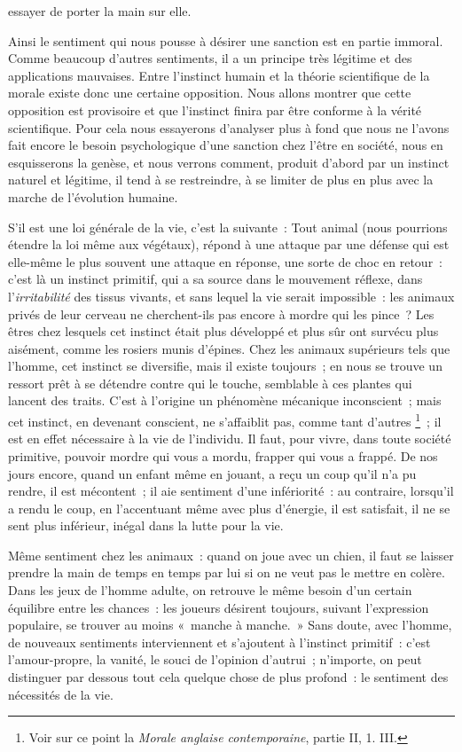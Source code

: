 \documentclass[french,twoside]{book} %
\begin{document}
essayer de porter la main sur elle.\par
Ainsi le sentiment qui nous pousse à désirer une sanction est en partie immoral. Comme beaucoup d’autres sentiments, il a un principe très légitime et des applications mauvaises. Entre l’instinct humain et la théorie scientifique de la morale existe donc une certaine opposition. Nous allons montrer que cette opposition est provisoire et que l’instinct finira par être conforme à la vérité scientifique. Pour cela nous essayerons d’analyser plus à fond que nous ne l’avons fait encore le besoin psychologique d’une sanction chez l’être en société, nous en esquisserons la genèse, et nous verrons comment, produit d’abord par un instinct naturel et légitime, il tend à se restreindre, à se limiter de plus en plus avec la marche de l’évolution humaine.\par
S’il est une loi générale de la vie, c’est la suivante : Tout animal (nous pourrions étendre la loi même aux végétaux), répond à une attaque par une défense qui est elle-même le plus souvent une attaque en réponse, une sorte de choc en retour : c’est là un instinct primitif, qui a sa source dans le mouvement réflexe, dans l’\emph{irritabilité} des tissus vivants, et sans lequel la vie serait impossible : les animaux privés de leur cerveau ne cherchent-ils pas encore à mordre qui les pince ? Les êtres chez lesquels cet instinct était plus développé et plus sûr ont survécu plus aisément, comme les rosiers munis d’épines. Chez les animaux supérieurs tels que l’homme, cet instinct se diversifie, mais il existe toujours ; en nous se trouve un ressort prêt à se détendre contre qui le touche, semblable à ces plantes qui lancent des traits. C’est à l’origine un phénomène mécanique inconscient ; mais cet instinct, en devenant conscient, ne s’affaiblit pas, comme tant d’autres \footnote{Voir sur ce point la \emph{Morale anglaise contemporaine}, partie II, 1. III.} ; il est en effet nécessaire à la vie de l’individu. Il faut, pour vivre, dans toute société primitive, pouvoir mordre qui vous a mordu, frapper qui vous a frappé. De nos jours encore, quand un enfant même en jouant, a reçu un coup qu’il n’a pu rendre, il est mécontent ; il aie sentiment d’une infériorité : au contraire, lorsqu’il a rendu le coup, en l’accentuant même avec plus d’énergie, il est satisfait, il ne se sent plus inférieur, inégal dans la lutte pour la vie.\par
Même sentiment chez les animaux : quand on joue avec un chien, il faut se laisser prendre la main de temps en temps par lui si on ne veut pas le mettre en colère. Dans les jeux de l’homme adulte, on retrouve le même besoin d’un certain équilibre entre les chances : les joueurs désirent toujours, suivant l’expression populaire, se trouver au moins « manche à manche. » Sans doute, avec l’homme, de nouveaux sentiments interviennent et s’ajoutent à l’instinct primitif : c’est l’amour-propre, la vanité, le souci de l’opinion d’autrui ; n’importe, on peut distinguer par dessous tout cela quelque chose de plus profond : le sentiment des nécessités de la vie.\par
\end{document}
